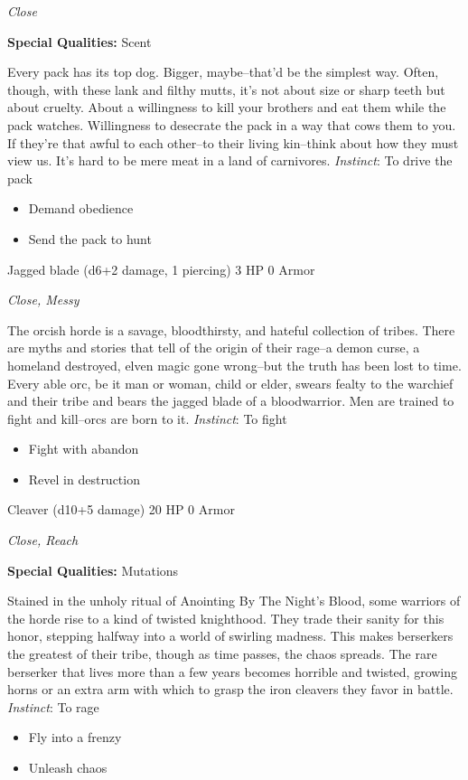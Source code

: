 \emph{Close}

\textbf{Special Qualities:}
Scent

\HRule
Every pack has its top dog. Bigger, maybe--that'd be the simplest way. Often, though, with these lank and filthy mutts, it's not about size or sharp teeth but about cruelty. About a willingness to kill your brothers and eat them while the pack watches. Willingness to desecrate the pack in a way that cows them to you. If they're that awful to each other--to their living kin--think about how they must view us. It's hard to be mere meat in a land of carnivores. \emph{Instinct}: To drive the pack
\begin{itemize}
\item Demand obedience
\item Send the pack to hunt
\end{itemize}

\HRule
{}

Jagged blade (d6+2 damage, 1 piercing)\hspace*{\fill} 3 HP 0 Armor

\emph{Close, Messy}

\HRule
The orcish horde is a savage, bloodthirsty, and hateful collection of tribes. There are myths and stories that tell of the origin of their rage--a demon curse, a homeland destroyed, elven magic gone wrong--but the truth has been lost to time. Every able orc, be it man or woman, child or elder, swears fealty to the warchief and their tribe and bears the jagged blade of a bloodwarrior. Men are trained to fight and kill--orcs are born to it. \emph{Instinct}: To fight
\begin{itemize}
\item Fight with abandon
\item Revel in destruction
\end{itemize}
\newpage
\HRule
{}

Cleaver (d10+5 damage)\hspace*{\fill} 20 HP 0 Armor

\emph{Close, Reach}

\textbf{Special Qualities:}
Mutations

\HRule
Stained in the unholy ritual of Anointing By The Night's Blood, some warriors of the horde rise to a kind of twisted knighthood. They trade their sanity for this honor, stepping halfway into a world of swirling madness. This makes berserkers the greatest of their tribe, though as time passes, the chaos spreads. The rare berserker that lives more than a few years becomes horrible and twisted, growing horns or an extra arm with which to grasp the iron cleavers they favor in battle. \emph{Instinct}: To rage
\begin{itemize}
\item Fly into a frenzy
\item Unleash chaos
\end{itemize}
\newpage
\HRule
{}

